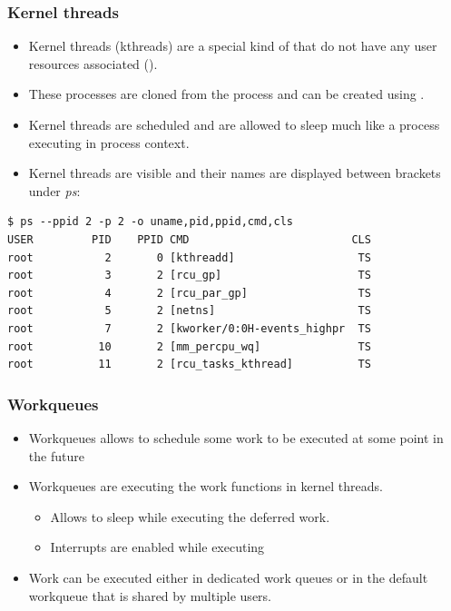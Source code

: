 \begin{frame}[fragile]
  \frametitle{Kernel threads}
  \begin{itemize}
    \item Kernel threads (kthreads) are a special kind of  that do not
          have any user resources associated ().
    \item These processes are cloned from the  process and can be
          created using .
    \item Kernel threads are scheduled and are allowed to sleep much like a
          process executing in process context.
    \item Kernel threads are visible and their names are displayed between
          brackets under {\em ps}:
  \end{itemize}
  \begin{block}{}
    \begin{verbatim}
$ ps --ppid 2 -p 2 -o uname,pid,ppid,cmd,cls
USER         PID    PPID CMD                         CLS
root           2       0 [kthreadd]                   TS
root           3       2 [rcu_gp]                     TS
root           4       2 [rcu_par_gp]                 TS
root           5       2 [netns]                      TS
root           7       2 [kworker/0:0H-events_highpr  TS
root          10       2 [mm_percpu_wq]               TS
root          11       2 [rcu_tasks_kthread]          TS
    \end{verbatim}
  \end{block}
\end{frame}

\begin{frame}
  \frametitle{Workqueues}
  \begin{itemize}
    \item Workqueues allows to schedule some work to be executed at some point
          in the future
    \item Workqueues are executing the work functions in kernel threads.
    \begin{itemize}
      \item Allows to sleep while executing the deferred work.
      \item Interrupts are enabled while executing
    \end{itemize}
    \item Work can be executed either in dedicated work queues or in the
          default workqueue that is shared by multiple users.
  \end{itemize}
\end{frame}


